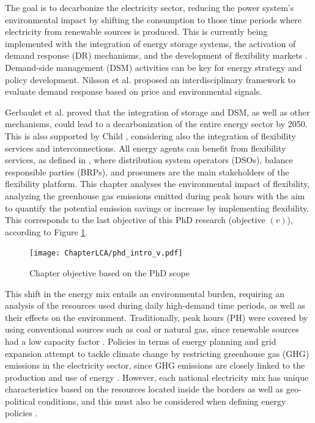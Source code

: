 The goal is to {decarbonize the electricity sector, reducing the power system's environmental impact by shifting the consumption to those time periods where electricity from renewable sources is produced}. This is currently being implemented with the integration of energy storage systems, the activation of demand response (DR) mechanisms, and the development of flexibility markets \cite{USEFFoundation2015a,  LocalMicroPowerMarkets2019CH2}. Demand-side management (DSM) activities can be key for energy strategy and policy development. Nilsson et al. \cite{NILSSON2018273} proposed an interdisciplinary framework to evaluate demand response based on price and environmental signals.  {Gerbaulet et al. \cite{GERBAULET2019973} proved that the integration of storage and DSM, as well as other mechanisms, could lead to a decarbonization of the entire energy sector by 2050. This is also supported by Child \cite{CHILD201980}, considering also the integration of flexibility services and interconnections. All energy agents can benefit from flexibility services, as defined in \cite{Olivella2018}, where distribution system operators (DSOs), balance responsible parties (BRPs), and prosumers are the main stakeholders of the flexibility platform. This chapter analyses the environmental impact of flexibility, analyzing the greenhouse gas emissions emitted during peak hours with the aim to quantify the potential emission savings or increase by implementing flexibility. This corresponds to the last objective of this PhD research (objective $(v)$), according to Figure \ref{fig:chapter_obj_v}. 

\begin{figure}[h]
	\centering
	\texttt{[image: ChapterLCA/phd\_intro\_v.pdf]}
		\caption{Chapter objective based on the PhD scope}
	\label{fig:chapter_obj_v}  
\end{figure}


This shift in the energy mix entails an environmental burden, requiring an analysis of the resources used during  daily high-demand time periods, as well as their effects on the environment. Traditionally, peak hours (PH) were covered by using conventional sources such as coal or natural gas, since renewable sources had a low capacity factor \cite{NEVES2018905}. Policies in terms of energy planning and grid expansion attempt to tackle  climate change by restricting greenhouse gas (GHG) emissions in the electricity sector, since GHG emissions are closely linked to the production and use of energy \cite{Sinn2008PublicApproach}. However, each national electricity mix has unique characteristics based on the resources located inside the borders as well as geo-political conditions, and this must also be considered when defining energy policies \cite{Murdock2018, DAHAL2018222, LEVIN201953, BEST2018404, ZHAO2018303, SIMOES2017353}. 

}
